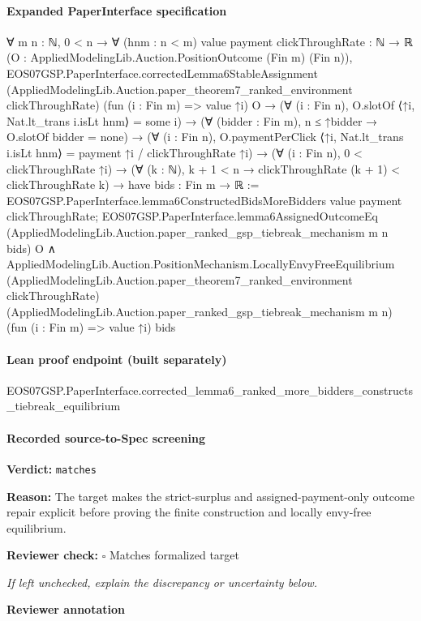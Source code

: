 \documentclass[10pt]{article}
\newcommand{\reviewerbox}{%
  \par\noindent\fbox{\parbox{0.96\linewidth}{\rule{0pt}{0.38in}}}\par
}
\newcommand{\reviewmatch}[1]{%
  \par\noindent\textbf{Reviewer check:} $\square$\; #1\par
  \noindent\emph{If left unchecked, explain the discrepancy or uncertainty below.}\par
}
\begin{document}
\paragraph{Expanded PaperInterface specification}
\begin{ReviewVerbatim}
∀ {m n : ℕ},
  0 < n →
    ∀ (hnm : n < m) {value payment clickThroughRate : ℕ → ℝ}
      (O : AppliedModelingLib.Auction.PositionOutcome (Fin m) (Fin n)),
      EOS07GSP.PaperInterface.correctedLemma6StableAssignment
          (AppliedModelingLib.Auction.paper_theorem7_ranked_environment clickThroughRate) (fun (i : Fin m) => value ↑i)
          O →
        (∀ (i : Fin n), O.slotOf ⟨↑i, Nat.lt_trans i.isLt hnm⟩ = some i) →
          (∀ (bidder : Fin m), n ≤ ↑bidder → O.slotOf bidder = none) →
            (∀ (i : Fin n), O.paymentPerClick ⟨↑i, Nat.lt_trans i.isLt hnm⟩ = payment ↑i / clickThroughRate ↑i) →
              (∀ (i : Fin n), 0 < clickThroughRate ↑i) →
                (∀ (k : ℕ), k + 1 < n → clickThroughRate (k + 1) < clickThroughRate k) →
                  have bids : Fin m → ℝ :=
                    EOS07GSP.PaperInterface.lemma6ConstructedBidsMoreBidders value payment clickThroughRate;
                  EOS07GSP.PaperInterface.lemma6AssignedOutcomeEq
                      (AppliedModelingLib.Auction.paper_ranked_gsp_tiebreak_mechanism m n bids) O ∧
                    AppliedModelingLib.Auction.PositionMechanism.LocallyEnvyFreeEquilibrium
                      (AppliedModelingLib.Auction.paper_theorem7_ranked_environment clickThroughRate)
                      (AppliedModelingLib.Auction.paper_ranked_gsp_tiebreak_mechanism m n) (fun (i : Fin m) => value ↑i)
                      bids
\end{ReviewVerbatim}



\paragraph{Lean proof endpoint (built separately)}\begin{ReviewVerbatim}
EOS07GSP.PaperInterface.corrected_lemma6_ranked_more_bidders_constructs_tiebreak_equilibrium
\end{ReviewVerbatim}

\paragraph{Recorded source-to-Spec screening}
\textbf{Verdict:} \texttt{matches}
\\
{\raggedright
\textbf{Reason:} The target makes the strict-\allowbreak{}surplus and assigned-\allowbreak{}payment-\allowbreak{}only outcome repair explicit before proving the finite construction and locally envy-\allowbreak{}free equilibrium.\allowbreak{}
\par}
\reviewmatch{Matches formalized target}
\noindent\textbf{Reviewer annotation}\par
\reviewerbox
\clearpage
\hypertarget{source-claim-c52506a4136e9a4c}{}
\end{document}
